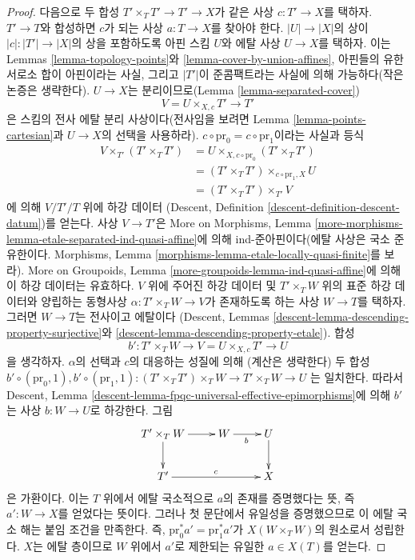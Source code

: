 \begin{proof}
\medskip\noindent
다음으로 두 합성 $T' \times_T T' \to T' \to X$가 같은 사상
$c : T' \to X$를 택하자. $T' \to T$와 합성하면 $c$가 되는
사상 $a : T \to X$를 찾아야 한다. $|U| \to |X|$의 상이
$|c| : |T'| \to |X|$의 상을 포함하도록 아핀 스킴 $U$와
에탈 사상 $U \to X$를 택하자. 이는 Lemmas
\ref{lemma-topology-points}와 \ref{lemma-cover-by-union-affines},
아핀들의 유한 서로소 합이 아핀이라는 사실, 그리고 $|T'|$이
준콤팩트라는 사실에 의해 가능하다(작은 논증은 생략한다).
$U \to X$는 분리이므로(Lemma \ref{lemma-separated-cover})
$$
V = U \times_{X, c} T' \longrightarrow T'
$$
은 스킴의 전사 에탈 분리 사상이다(전사임을 보려면
Lemma \ref{lemma-points-cartesian}과 $U \to X$의 선택을 사용하라).
$c \circ \text{pr}_0 = c \circ \text{pr}_1$이라는 사실과 등식
\begin{align*}
V \times_{T'} (T' \times_T T')
& =
U \times_{X, c \circ \text{pr}_0} (T' \times_T T') \\
& =
(T' \times_T T') \times_{c \circ \text{pr}_1, X} U \\
& =
(T' \times_T T') \times_{T'} V
\end{align*}
에 의해 $V/T'/T$ 위에 하강 데이터
(Descent, Definition \ref{descent-definition-descent-datum})를 얻는다.
사상 $V \to T'$은 More on Morphisms, Lemma
\ref{more-morphisms-lemma-etale-separated-ind-quasi-affine}에 의해
ind-준아핀이다(에탈 사상은 국소 준유한이다. Morphisms, Lemma
\ref{morphisms-lemma-etale-locally-quasi-finite}를 보라).
More on Groupoids, Lemma \ref{more-groupoids-lemma-ind-quasi-affine}에 의해
이 하강 데이터는 유효하다. $V$ 위에 주어진 하강 데이터 및
$T' \times_T W$ 위의 표준 하강 데이터와 양립하는 동형사상
$\alpha : T' \times_T W \to V$가 존재하도록 하는 사상
$W \to T$를 택하자. 그러면 $W \to T$는 전사이고 에탈이다
(Descent, Lemmas \ref{descent-lemma-descending-property-surjective}와
\ref{descent-lemma-descending-property-etale}).
합성
$$
b' : T' \times_T W \longrightarrow V = U \times_{X, c} T' \longrightarrow U
$$
을 생각하자. $\alpha$의 선택과 $c$의 대응하는 성질에 의해
(계산은 생략한다) 두 합성
$b' \circ (\text{pr}_0, 1), 
b' \circ (\text{pr}_1, 1) :
(T' \times_T T') \times_T W \to T' \times_T W \to U$
는 일치한다. 따라서 Descent, Lemma
\ref{descent-lemma-fpqc-universal-effective-epimorphisms}에 의해
$b'$는 사상 $b : W \to U$로 하강한다. 그림
$$
\xymatrix{
T' \times_T W \ar[r] \ar[d] & W \ar[r]_b & U \ar[d] \\
T' \ar[rr]^c &  & X
}
$$
은 가환이다. 이는 $T$ 위에서 에탈 국소적으로 $a$의 존재를
증명했다는 뜻, 즉 $a' : W \to X$를 얻었다는 뜻이다.
그러나 첫 문단에서 유일성을 증명했으므로 이 에탈 국소 해는
붙임 조건을 만족한다. 즉,
$\text{pr}_0^*a' = \text{pr}_1^*a'$가 $X(W \times_T W)$의 원소로서
성립한다. $X$는 에탈 층이므로 $W$ 위에서 $a'$로 제한되는 유일한
$a \in X(T)$를 얻는다.
\end{proof}

